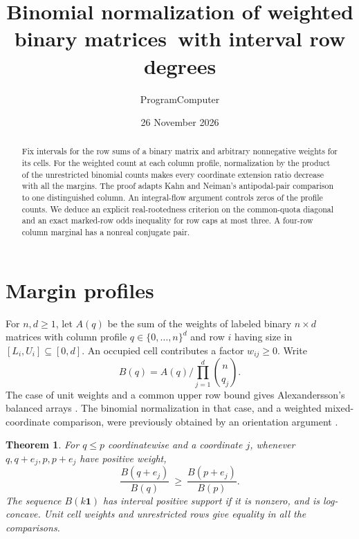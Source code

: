 \documentclass[11pt]{article}
\title{Binomial normalization of weighted binary matrices\ with interval row degrees}
\author{ProgramComputer}
\date{26 November 2026}
\newtheorem{theorem}{Theorem}
\newcommand{\bone}{\mathbf{1}}
\begin{document}
\maketitle
\begin{abstract}
Fix intervals for the row sums of a binary matrix and arbitrary nonnegative weights for its cells. For the weighted count at each column profile, normalization by the product of the unrestricted binomial counts makes every coordinate extension ratio decrease with all the margins. The proof adapts Kahn and Neiman's antipodal-pair comparison to one distinguished column. An integral-flow argument controls zeros of the profile counts. We deduce an explicit real-rootedness criterion on the common-quota diagonal and an exact marked-row odds inequality for row caps at most three. A four-row column marginal has a nonreal conjugate pair.
\end{abstract}

\section{Margin profiles}
For $n,d\ge1$, let $A(q)$ be the sum of the weights of labeled binary $n\times d$ matrices with column profile $q\in\{0,\ldots,n\}^d$ and row $i$ having size in $[L_i,U_i]\subseteq[0,d]$. An occupied cell contributes a factor $w_{ij}\ge0$. Write
\[
 B(q)=A(q)\bigg/\prod_{j=1}^d\binom n{q_j}.
\]
The case of unit weights and a common upper row bound gives Alexandersson's balanced arrays \cite{symcat}. The binomial normalization in that case, and a weighted mixed-coordinate comparison, were previously obtained by an orientation argument \cite{repo}.

\begin{theorem}\label{normal}
For $q\le p$ coordinatewise and a coordinate $j$, whenever $q,q+e_j,p,p+e_j$ have positive weight,
\[
 \frac{B(q+e_j)}{B(q)}\ \ge\ \frac{B(p+e_j)}{B(p)} .
\]
The sequence $B(k\bone)$ has interval positive support if it is nonzero, and is log-concave. Unit cell weights and unrestricted rows give equality in all the comparisons.
\end{theorem}
\end{document}
